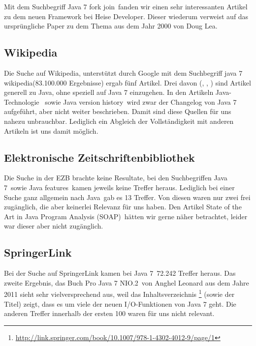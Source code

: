 Mit dem Suchbegriff \glqq Java 7 fork join\grqq ~fanden wir einen sehr interessanten Artikel zu dem neuen Framework bei Heise Developer\cite{forkjoinheise}. Dieser wiederum verweist auf das ursprüngliche Paper zu dem Thema aus dem Jahr 2000 von Doug Lea\cite{forkjoinpaper}.

\subsection{Wikipedia}\label{wikichapter}
Die Suche auf Wikipedia, unterstützt durch Google mit dem Suchbegriff \glqq java 7 wikipedia\grqq (83.100.000 Ergebnisse) ergab
fünf Artikel. Drei davon (\cite{wikiJavaSoftwarePlatform}, \cite{wikiJavaProgrammiersprache}, \cite{wikiJavaStandardEdition})
sind Artikel generell zu Java, ohne speziell auf Java 7 einzugehen. In den Artikeln \glqq Java-Technologie\grqq\cite{wikiJavaTechnologie}
~sowie \glqq Java version history\grqq\cite{wikiJavaVersionHistory}~wird zwar der Changelog von Java 7 aufgeführt, aber nicht
weiter beschrieben. Damit sind diese Quellen für uns nahezu unbrauchbar. Lediglich ein Abgleich der Vollständigkeit mit anderen
Artikeln ist uns damit möglich.

\subsection{Elektronische Zeitschriftenbibliothek}
Die Suche in der EZB brachte keine Resultate, bei den Suchbegriffen \glqq Java 7\grqq~sowie \glqq Java features\grqq~kamen
jeweils keine Treffer heraus. Lediglich bei einer Suche ganz allgemein nach \glqq Java\grqq~gab es 13 Treffer. Von diesen waren
nur zwei frei zugänglich, die aber keinerlei Relevanz für uns haben. Den Artikel \glqq State of the Art in Java Program Analysis
(SOAP)\grqq~hätten wir gerne näher betrachtet, leider war dieser aber nicht zugänglich.

\subsection{SpringerLink}
Bei der Suche auf SpringerLink kamen bei \glqq Java 7\grqq~72.242 Treffer heraus. Das zweite Ergebnis, das Buch \glqq Pro Java 7
NIO.2\grqq\cite{b247nio2}~von Anghel Leonard aus dem Jahre 2011 sieht sehr vielversprechend aus, weil das Inhaltsverzeichnis
\footnote{\url{http://link.springer.com/book/10.1007/978-1-4302-4012-9/page/1}} (sowie der Titel) zeigt, dass es um viele der neuen
I/O-Funktionen von Java 7 geht.
Die anderen Treffer innerhalb der ersten 100 waren für uns nicht relevant.\\

